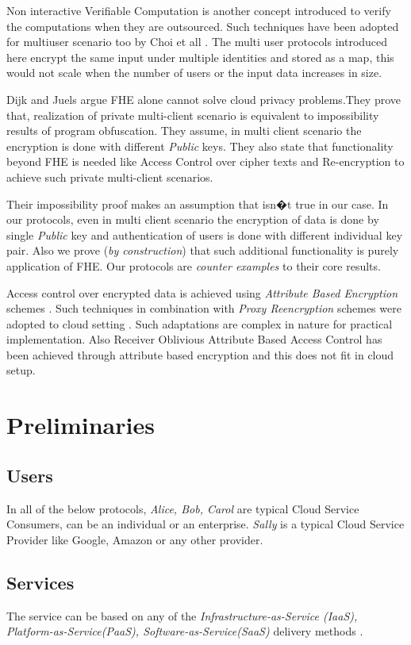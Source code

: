 \documentclass[conference]{IEEEtran}
\numberwithin{equation}{section}
\begin{document}
Non interactive Verifiable Computation \cite{gennaro2010non} is another concept introduced to verify the computations when they are outsourced. Such techniques have been adopted for multiuser scenario too by Choi et all \cite{choimulti}. The multi user protocols introduced here encrypt the same input under multiple identities and stored as a map, this would not scale when the number of users or the input data increases in size.

 Dijk and Juels argue FHE alone cannot solve cloud privacy problems\cite{van2010impossibility}.They prove that, realization of private multi-client scenario is equivalent to impossibility results of program obfuscation. They assume, in multi client scenario the encryption is done with different \emph{Public} keys. They also state that functionality beyond FHE is needed like Access Control over cipher texts and Re-encryption to achieve such private multi-client scenarios. 

  Their impossibility proof makes an assumption that isn�t true in our case. In our protocols, even in multi client scenario the encryption of data is done by single \emph{Public} key and authentication of users is done with different individual key pair. Also we prove (\emph{by construction}) that such additional functionality is purely application of FHE. Our protocols are \emph{counter examples} to their core results.

  Access control over encrypted data is achieved using \emph{Attribute Based Encryption} schemes \cite{goyal2006attribute} \cite{bethencourt2007ciphertext}. Such techniques in combination with \emph{Proxy Reencryption} schemes were adopted to cloud setting \cite{yu2010achieving}. Such adaptations are complex in nature for practical implementation. Also Receiver Oblivious Attribute Based Access Control has been achieved through attribute based encryption \cite{han2012attribute} and this does not fit in cloud setup.
\section{Preliminaries}
  \subsection{Users}
 In all of the below protocols, \emph{Alice, Bob, Carol} are typical Cloud Service Consumers, can be an individual or an enterprise. \emph{Sally} is a typical Cloud Service Provider like Google, Amazon or any other provider. 
 \subsection{Services} The service can be based on any of the \emph{Infrastructure-as-Service (IaaS), Platform-as-Service(PaaS), Software-as-Service(SaaS)} delivery methods \cite {mell2011nist}. 
\end{document}
